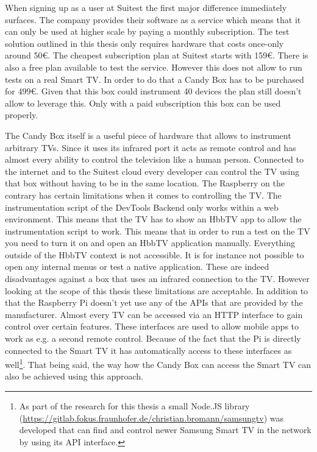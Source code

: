 When signing up as a user at Suitest the first major difference immediately surfaces. The company provides their software
as a service which means that it can only be used at higher scale by paying a monthly subscription. The test solution
outlined in this thesis only requires hardware that costs once-only around 50\euro. The cheapest subscription plan
at Suitest starts with 159\euro. There is also a free plan available to test the service. However this does not allow
to run tests on a real Smart TV. In order to do that a Candy Box has to be purchased for 499\euro. Given that this
box could instrument 40 devices the plan still doesn't allow to leverage this. Only with a paid subscription this box
can be used properly.

The Candy Box itself is a useful piece of hardware that allows to instrument arbitrary TVs. Since it uses its infrared
port it acts as remote control and has almost every ability to control the television like a human person. Connected
to the internet and to the Suitest cloud every developer can control the TV using that box without having
to be in the same location. The Raspberry on the contrary has certain limitations when it comes to controlling the TV.
The instrumentation script of the DevTools Backend only works within a web environment. This means that the TV has to
show an HbbTV app to allow the instrumentation script to work. This means that in order to run a test on the TV you
need to turn it on and open an HbbTV application manually. Everything outside of the HbbTV context is not accessible.
It is for instance not possible to open any internal menus or test a native application. These are indeed disadvantages
against a box that uses an infrared connection to the TV. However looking at the scope of this thesis these limitations
are acceptable. In addition to that the Raspberry Pi doesn't yet use any of the APIs that are provided by the
manufacturer. Almost every TV can be accessed via an HTTP interface to gain control over certain features. These
interfaces are used to allow mobile apps to work as e.g. a second remote control. Because of the fact that the Pi is
directly connected to the Smart TV it has automatically access to these interfaces as well\footnote{As part of the
research for this thesis a small Node.JS library (\url{https://gitlab.fokus.fraunhofer.de/christian.bromann/samsungtv})
was developed that can find and control newer Samsung Smart TV in the network by using its API interface.}. That being
said, the way how the Candy Box can access the Smart TV can also be achieved using this approach.

